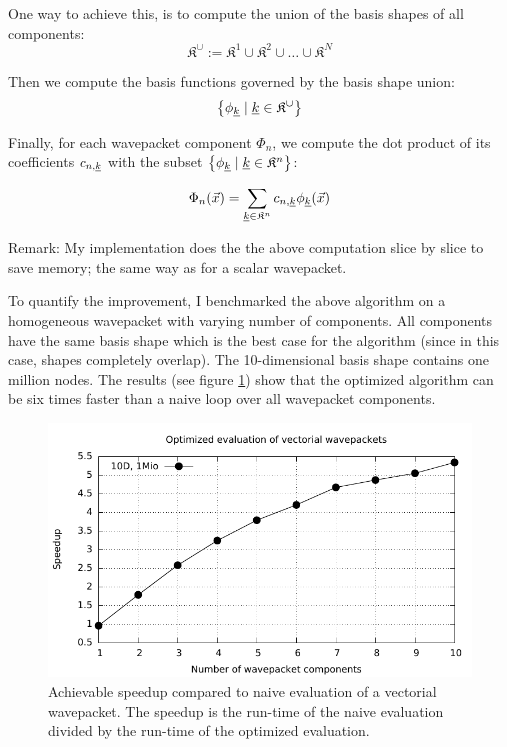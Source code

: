 \documentclass{article}
\begin{document}
One way to achieve this, is to compute the union of the
basis shapes of all components:
\[
\mathfrak{K}^{\cup} := \mathfrak{K}^1 \cup \mathfrak{K}^2 \cup \dots \cup \mathfrak{K}^N
\]

Then we compute the basis functions governed by the basis shape union:
\[
\left\{\phi_{\underline{k}} \;|\;\underline{k} \in \mathfrak{K}^{\cup}\right\}
\]

Finally, for each wavepacket component \(\Phi_n\),
we compute the dot product of its coefficients \(c_{n,\underline{k}}\)
with the subset \(\left\{\phi_{\underline{k}}\;|\; \underline{k} \in \mathfrak{K}^n\right\}\):

\[
\Phi_n(\vec{x})=\sum_{\underline{k} \in \mathfrak{K}^n} c_{n,\underline{k}} \phi_{\underline{k}}(\vec{x})
\]

Remark: My implementation does the the above computation slice by slice to save memory;
the same way as for a scalar wavepacket.

To quantify the improvement, I benchmarked the above algorithm on a homogeneous wavepacket with
varying number of components. All components have the same basis shape which is
the best case for the algorithm (since in this case, shapes completely overlap).
The 10-dimensional basis shape contains one million nodes.
The results (see figure \ref{fig:hawp_homogen_evaluation_speedup}) show that the
optimized algorithm can be six times faster than a naive loop over all
wavepacket components.

\begin{figure}[H]
  \centering
  \includegraphics[width=1.0\textwidth]{plots/hawp_eval_homogen_speedup}
  \caption{
    Achievable speedup compared to naive evaluation of a vectorial wavepacket.
    The speedup is the run-time of the naive evaluation divided by the run-time of
    the optimized evaluation.
  }
  \label{fig:hawp_homogen_evaluation_speedup}
\end{figure}
\end{document}
